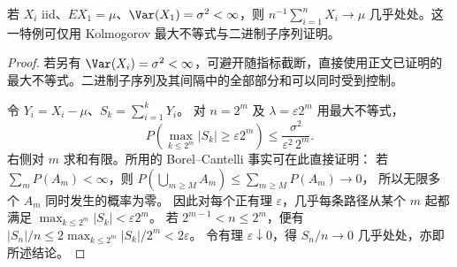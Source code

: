 \begin{corollary}[有限方差强大数律的最大不等式证明]
若 $X_i$ iid、$EX_1=\mu$、$\Var(X_1)=\sigma^2<\infty$，则 $n^{-1}\sum_{i=1}^nX_i\to\mu$ 几乎处处。这一特例可仅用 Kolmogorov 最大不等式与二进制子序列证明。
\end{corollary}
\begin{proof}
若另有 $\Var(X_i)=\sigma^2<\infty$，可避开随指标截断，直接使用正文已证明的最大不等式。二进制子序列及其间隔中的全部部分和可以同时受到控制。

令 \(Y_i=X_i-\mu\)、\(S_k=\sum_{i=1}^kY_i\)。
对 \(n=2^m\) 及 \(\lambda=\varepsilon2^m\) 用最大不等式，
\[
P\!\left(\max_{k\le2^m}|S_k|\ge\varepsilon2^m\right)
\le\frac{\sigma^2}{\varepsilon^2\,2^m}.
\]
右侧对 \(m\) 求和有限。所用的 Borel--Cantelli 事实可在此直接证明：
若 \(\sum_mP(A_m)<\infty\)，则
\(P(\bigcup_{m\ge M}A_m)\le\sum_{m\ge M}P(A_m)\to0\)，
所以无限多个 \(A_m\) 同时发生的概率为零。
因此对每个正有理 \(\varepsilon\)，几乎每条路径从某个
\(m\) 起都满足
\(\max_{k\le2^m}|S_k|<\varepsilon2^m\)。
若 \(2^{m-1}<n\le2^m\)，便有
\(|S_n|/n\le2\max_{k\le2^m}|S_k|/2^m<2\varepsilon\)。
令有理 \(\varepsilon\downarrow0\)，得 \(S_n/n\to0\)
几乎处处，亦即所述结论。
\end{proof}


